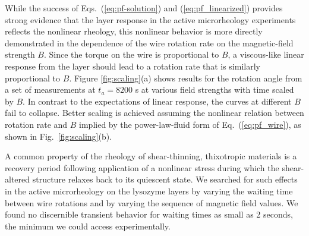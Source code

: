 While the success of Eqs.~(\ref{eq:pf-solution}) and (\ref{eq:pf_linearized}) provides strong evidence that the layer response in the active microrheology experiments reflects the nonlinear rheology, this nonlinear behavior is more directly demonstrated in the dependence of the wire rotation rate on the magnetic-field strength $B$.  Since the torque on the wire is proportional to $B$, a viscous-like linear response from the layer should lead to a rotation rate that is similarly proportional to $B$.  Figure \ref{fig:scaling}(a) shows results for the rotation angle from a set of measurements at $t_a = 8200$ s at various field strengths with time scaled by $B$.  In contrast to the expectations of linear response, the curves at different $B$ fail to collapse.  Better scaling is achieved assuming the nonlinear relation between rotation rate and $B$ implied by the power-law-fluid form of Eq.~(\ref{eq:pf_wire}), as shown in Fig.~\ref{fig:scaling}(b).

A common property of the rheology of shear-thinning, thixotropic materials is a recovery period following application of a nonlinear stress during which the shear-altered structure relaxes back to its quiescent state.  We searched for such effects in the active microrheology on the lysozyme layers by varying the waiting time between wire rotations and by varying the sequence of magnetic field values.   We found no discernible transient behavior for waiting times as small as 2 seconds, the minimum we could access experimentally.

